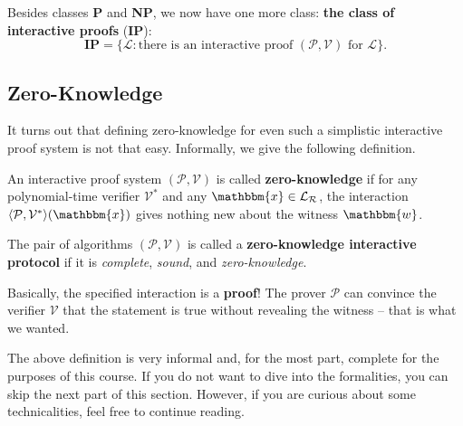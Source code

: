 \documentclass[../../book.tex]{subfiles}
\begin{document}
\begin{definition}
    Besides classes \textbf{P} and \textbf{NP}, we now have one more class:
    \textbf{the class of interactive proofs} (\textbf{IP}):
    \begin{equation*}
        \mathbf{IP} = \{\mathcal{L}: \text{there is an interactive proof $(\mathcal{P}, \mathcal{V})$ for $\mathcal{L}$}\}.
    \end{equation*}
\end{definition}

\subsection{Zero-Knowledge}

It turns out that defining zero-knowledge for even such a simplistic interactive
proof system is not that easy. Informally, we give the following definition.

\begin{definition}
    An interactive proof system $(\mathcal{P}, \mathcal{V})$ is called
    \textbf{zero-knowledge} if for any polynomial-time verifier $\mathcal{V}^*$
    and any $\mathbbm{x} \in \mathcal{L}_{\mathcal{R}}$, the interaction
    $\langle \mathcal{P}, \mathcal{V}^* \rangle(\mathbbm{x})$ gives nothing new
    about the witness $\mathbbm{w}$.
\end{definition}

\begin{definition}
    The pair of algorithms $(\mathcal{P}, \mathcal{V})$ is called a
    \textbf{zero-knowledge interactive protocol} if it is \textit{complete},
    \textit{sound}, and \textit{zero-knowledge}.
\end{definition}

\vspace{-1mm}

Basically, the specified interaction is a \textbf{proof}! The prover
$\mathcal{P}$ can convince the verifier $\mathcal{V}$ that the statement is true
without revealing the witness -- that is what we wanted.

\vspace{-1mm}

\begin{remark}
    The above definition is very informal and, for the most part, complete for
    the purposes of this course. If you do not want to dive into the
    formalities, you can skip the next part of this section. However, if you are
    curious about some technicalities, feel free to continue reading.
\end{remark}
\end{document}
